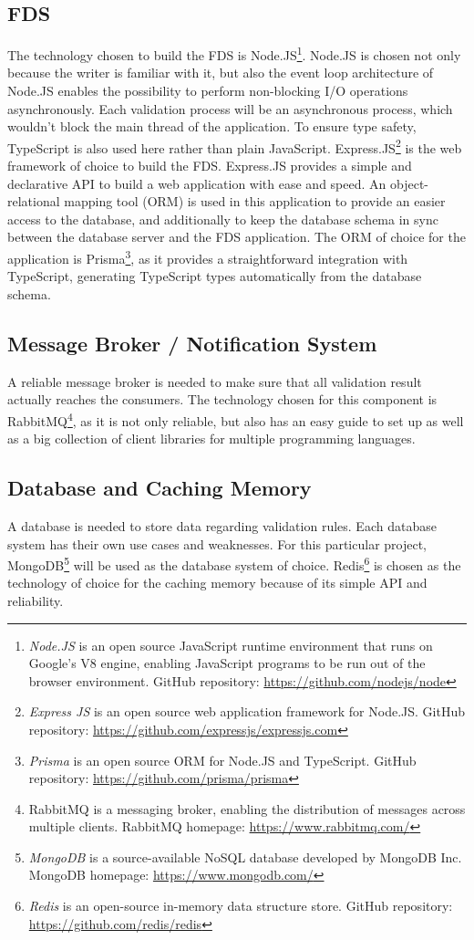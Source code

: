 \subsection{FDS}
The technology chosen to build the FDS is Node.JS\footnote{\emph{Node.JS} is an open source JavaScript runtime environment that runs on Google's V8 engine, enabling JavaScript programs to be run out of the browser environment. GitHub repository: \url{https://github.com/nodejs/node}}. Node.JS is chosen not only because the writer is familiar with it, but also the event loop architecture of Node.JS enables the possibility to perform non-blocking I/O operations asynchronously. Each validation process will be an asynchronous process, which wouldn't block the main thread of the application. To ensure type safety, TypeScript is also used here rather than plain JavaScript. Express.JS\footnote{\emph{Express JS} is an open source web application framework for Node.JS. GitHub repository: \url{https://github.com/expressjs/expressjs.com}} is the web framework of choice to build the FDS. Express.JS provides a simple and declarative API to build a web application with ease and speed.
An object-relational mapping tool (ORM) is used in this application to provide an easier access to the database, and additionally to keep the database schema in sync between the database server and the FDS application. The ORM of choice for the application is Prisma\footnote{\emph{Prisma} is an open source ORM for Node.JS and TypeScript. GitHub repository: \url{https://github.com/prisma/prisma}}, as it provides a straightforward integration with TypeScript, generating TypeScript types automatically from the database schema.

\subsection{Message Broker / Notification System}
A reliable message broker is needed to make sure that all validation result actually reaches the consumers. The technology chosen for this component is RabbitMQ\footnote{RabbitMQ is a messaging broker, enabling the distribution of messages across multiple clients. RabbitMQ homepage: \url{https://www.rabbitmq.com/}}, as it is not only reliable, but also has an easy guide to set up as well as a big collection of client libraries for multiple programming languages.

\subsection{Database and Caching Memory}
A database is needed to store data regarding validation rules. Each database system has their own use cases and weaknesses. For this particular project, MongoDB\footnote{\emph{MongoDB} is a source-available NoSQL database developed by MongoDB Inc. MongoDB homepage: \url{https://www.mongodb.com/}} will be used as the database system of choice. Redis\footnote{\emph{Redis} is an open-source in-memory data structure store. GitHub repository: \url{https://github.com/redis/redis}} is chosen as the technology of choice for the caching memory because of its simple API and reliability. 